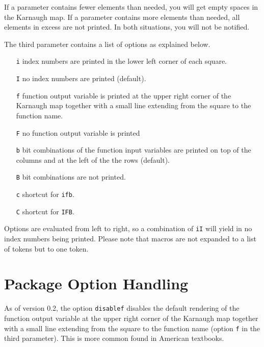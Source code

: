 \documentclass[a4paper,10pt]{ltxdoc}
\begin{document}
If a parameter contains fewer elements than needed, you will get empty spaces
in the Karnaugh map. If a parameter contains more elements than needed, all
elements in excess are not printed. In both situations, you will not be
notified.

The third parameter contains a list of options as explained below.
\begin{itemize}
    \itemsep0pt
    \item[\texttt{i}] index numbers are printed in the lower left corner of
                      each square.
    \item[\texttt{I}] no index numbers are printed (default).
    \item[\texttt{f}] function output variable is printed at the upper right
                      corner of the Karnaugh map together with a small line
                      extending from the square to the function
                      name.
    \item[\texttt{F}] no function output variable is printed
    \item[\texttt{b}] bit combinations of the function input variables are
                      printed on top of the columns and at the left of the the
                      rows (default).
    \item[\texttt{B}] bit combinations are not printed.
    \item[\texttt{c}] shortcut for \texttt{ifb}.
    \item[\texttt{C}] shortcut for \texttt{IFB}.
\end{itemize}

Options are evaluated from left to right, so a combination of \texttt{iI} will
yield in no index numbers being printed. Please note that macros are not
expanded to a list of tokens but to one token.


\section{Package Option Handling}
\label{sec:optionhandling}
As of version 0.2, the option \texttt{disablef} disables the default rendering
of the function output variable at the upper right corner of the Karnaugh map
together with a small line extending from the square to the function name
(option \texttt{f} in the third parameter). This is more common found in
American textbooks.
\end{document}
